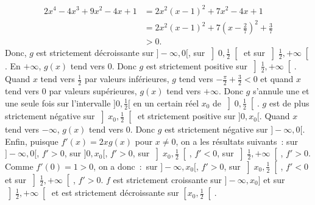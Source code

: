 {\begin{enumerate}
{\begin{align*}
2x^4-4x^3+9x^2-4x+1 &= 2x^2(x-1)^2+7x^2-4x+1 \\
&= 2x^2(x-1)^2+7\left(x-\frac{2}{7}\right)^2+\frac{3}{7} \\
&> 0.
\end{align*}
Donc, $g$ est
strictement décroissante sur $]-\infty,0[$, sur $\left]0,\frac{1}{2}\right[$ et sur $\left]\frac{1}{2},+\infty\right[$. En $+\infty$, $g(x)$
tend vers $0$. Donc $g$ est strictement positive sur $\left]\frac{1}{2},+\infty\right[$. Quand $x$ tend vers $\frac{1}{2}$ par
valeurs inférieures, $g$ tend vers $-\frac{\pi}{2}+\frac{3}{2}<0$ et quand $x$ tend vers $0$ par valeurs
supérieures, $g(x)$ tend vers $+\infty$. Donc $g$ s'annule une et une seule fois sur l'intervalle $]0,\frac{1}{2}[$ en
un certain réel $x_0$ de $\left]0,\frac{1}{2}\right[$. $g$ est de plus strictement négative sur $\left]x_0,\frac{1}{2}\right[$ 
et strictement positive sur $]0,x_0[$. Quand $x$ tend vers $-\infty$, $g(x)$ tend vers $0$. Donc $g$ est strictement
négative sur $]-\infty,0[$. Enfin, puisque $f'(x)=2xg(x)$ pour $x\neq0$, on a les résultats suivants~:
sur
$]-\infty,0[$, $f'> 0$, sur $]0,x_0[$, $f'> 0$, sur $\left]x_0,\frac{1}{2}\right[$, $f'< 0$, sur $\left]\frac{1}{2},+\infty\right[$, $f'>
0$. Comme $f'(0)=1>0$, on a donc~:~sur $]-\infty,x_0[$, $f'>0$,
sur $\left]x_0,\frac{1}{2}\right[$, $f'< 0$ et sur $\left]\frac{1}{2},+\infty\right[$, $f'> 0$. $f$ est strictement croissante sur
$]-\infty,x_0]$ et sur $\left]\frac{1}{2},+\infty\right[$ et est strictement décroissante sur $\left[x_0,\frac{1}{2}\right[$.
}
\end{enumerate}
}
